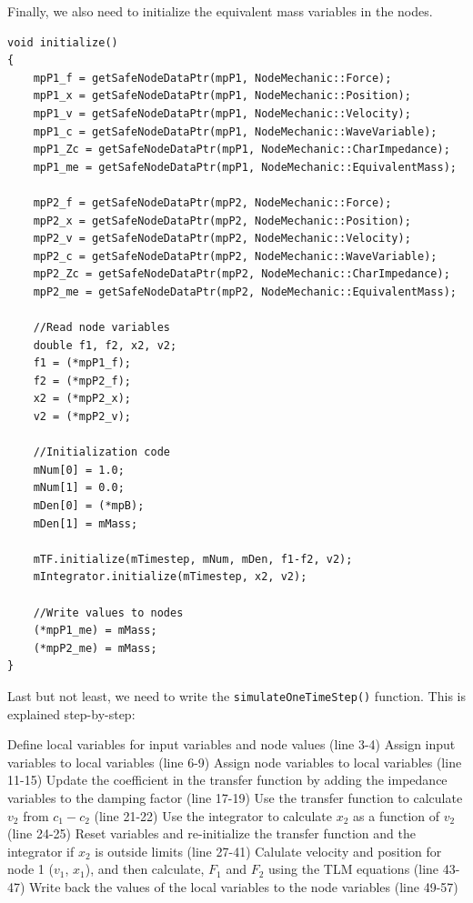 \documentclass[a4paper,pdftex]{article}
\begin{document}
 
\noindent Finally, we also need to initialize the equivalent mass variables in the nodes.

\noindent 
\begin{minipage}{\linewidth}
\begin{lstlisting}[basicstyle=\footnotesize\ttfamily]
void initialize()
{
    mpP1_f = getSafeNodeDataPtr(mpP1, NodeMechanic::Force);
    mpP1_x = getSafeNodeDataPtr(mpP1, NodeMechanic::Position);
    mpP1_v = getSafeNodeDataPtr(mpP1, NodeMechanic::Velocity);
    mpP1_c = getSafeNodeDataPtr(mpP1, NodeMechanic::WaveVariable);
    mpP1_Zc = getSafeNodeDataPtr(mpP1, NodeMechanic::CharImpedance);
    mpP1_me = getSafeNodeDataPtr(mpP1, NodeMechanic::EquivalentMass);

    mpP2_f = getSafeNodeDataPtr(mpP2, NodeMechanic::Force);
    mpP2_x = getSafeNodeDataPtr(mpP2, NodeMechanic::Position);
    mpP2_v = getSafeNodeDataPtr(mpP2, NodeMechanic::Velocity);
    mpP2_c = getSafeNodeDataPtr(mpP2, NodeMechanic::WaveVariable);
    mpP2_Zc = getSafeNodeDataPtr(mpP2, NodeMechanic::CharImpedance);
    mpP2_me = getSafeNodeDataPtr(mpP2, NodeMechanic::EquivalentMass);

    //Read node variables
    double f1, f2, x2, v2;
    f1 = (*mpP1_f);
    f2 = (*mpP2_f);
    x2 = (*mpP2_x);
    v2 = (*mpP2_v);

    //Initialization code
    mNum[0] = 1.0;
    mNum[1] = 0.0;
    mDen[0] = (*mpB);
    mDen[1] = mMass;

    mTF.initialize(mTimestep, mNum, mDen, f1-f2, v2);
    mIntegrator.initialize(mTimestep, x2, v2); 
    
    //Write values to nodes
    (*mpP1_me) = mMass;
    (*mpP2_me) = mMass;
}
\end{lstlisting}
\end{minipage}
 	
 	
\noindent Last but not least, we need to write the \texttt{simulateOneTimeStep()} function. This is explained step-by-step: 
\begin{tutenumerate}
Define local variables for input variables and node values (line 3-4)
Assign input variables to local variables (line 6-9)
Assign node variables to local variables (line 11-15)
Update the coefficient in the transfer function by adding the impedance variables to the damping factor (line 17-19)
Use the transfer function to calculate $v_{2}$ from $c_{1}-c_{2}$ (line 21-22)
Use the integrator to calculate $x_{2}$ as a function of $v_{2}$ (line 24-25)
Reset variables and re-initialize the transfer function and the integrator if $x_{2}$ is outside limits (line 27-41)
Calulate velocity and position for node 1 ($v_{1}$, $x_{1}$), and then calculate, $F_{1}$ and $F_{2}$ using the TLM equations (line 43-47)
Write back the values of the local variables to the node variables (line 49-57)
\end{tutenumerate}
 	
\end{document}

